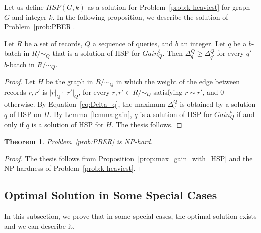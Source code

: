 \documentclass[sigconf, nonacm]{acmart}
\newtheorem{theorem}{Theorem}[section]
\begin{document}
Let us define $HSP(G,k)$ as a solution for Problem~\ref{prob:k-heaviest} for graph $G$ and integer $k$.  In the following proposition, we describe the solution of Problem~\ref{prob:PBER}.

\begin{proposition}\label{prop:max_gain_with_HSP}
    Let $R$ be a set of records, $Q$ a sequence of queries, and $b$ an integer. Let $q$ be a $b$-batch in $R/\sim_Q$ that is a solution of HSP for $\textit{Gain}^b_Q$. Then $\Delta^Q_q \geq \Delta^Q_{q'}$ for every $q'$ $b$-batch in $R/\sim_Q$.    
\end{proposition}
\begin{proof}
    Let $H$ be the graph in $R/\sim_Q$ in which the weight of the edge between records $r, r'$ is $|r|_Q\cdot|r'|_Q$, for every $r,r'\in  R/\sim_Q$ satisfying $r\sim r'$, and 0 otherwise. By Equation~\ref{eq:Delta_q}, the maximum $\Delta^Q_{q}$ is obtained by a solution $q$ of HSP on $H$. By Lemma~\ref{lemma:gain}, $q$ is a solution of HSP for $\textit{Gain}^b_Q$ if and only if $q$ is a solution of HSP for $H$. The thesis follows.
\end{proof}

\begin{theorem}\label{th:progressive_is_NP_hard}
    Problem~\ref{prob:PBER} is NP-hard.
\end{theorem}
\begin{proof}
    The thesis follows from Proposition~\ref{prop:max_gain_with_HSP} and the NP-hardness of Problem~\ref{prob:k-heaviest}.
\end{proof}

\subsection{Optimal Solution in Some Special Cases}\label{sub:optimal_solution}

In this subsection, we prove that in some special cases, the optimal solution exists and we can describe it. 
\end{document}
